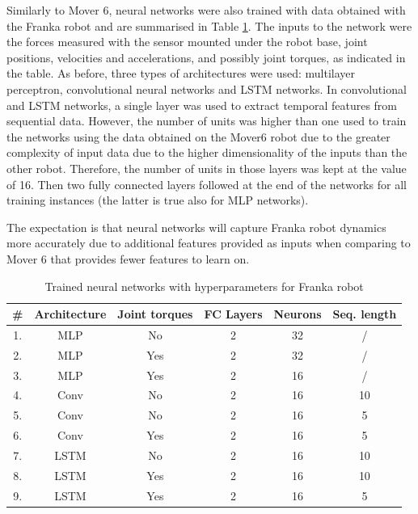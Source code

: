 Similarly to Mover 6, neural networks were also trained with data obtained with the Franka robot and are summarised in Table \ref{tab:NetworksFranka}. The inputs to the network were the forces measured with the sensor mounted under the robot base, joint positions, velocities and accelerations, and possibly joint torques, as indicated in the table. As before, three types of architectures were used: multilayer perceptron, convolutional neural networks and LSTM networks. In convolutional and LSTM networks, a single layer was used to extract temporal features from sequential data. However, the number of units was higher than one used to train the networks using the data obtained on the Mover6 robot due to the greater complexity of input data due to the higher dimensionality of the inputs than the other robot. Therefore, the number of units in those layers was kept at the value of 16. Then two fully connected layers followed at the end of the networks for all training instances (the latter is true also for MLP networks).

The expectation is that neural networks will capture Franka robot dynamics more accurately due to additional features provided as inputs when comparing to Mover 6 that provides fewer features to learn on.

\begin{table}
    \centering
    \caption{Trained neural networks with hyperparameters for Franka robot}
    \label{tab:NetworksFranka}
    \begin{tabular}{|c|c|c|c|c|c|}
        \hline
        \textbf{\#} & \textbf{Architecture} & \textbf{Joint torques} & \textbf{FC Layers} & \textbf{Neurons} & \textbf{Seq. length}  \\
        \hline
        \hline
        1. & MLP & No & 2 & 32 & / \\ %
        \hline
        2. & MLP & Yes & 2 & 32 & / \\ %
        \hline
        3. & MLP & Yes & 2 & 16 & / \\ %
        \hline
        4. & Conv & No & 2 & 16 & 10 \\ %
        \hline
        5. & Conv & No & 2 & 16 & 5\\ %
        \hline
        6. & Conv & Yes & 2 & 16 & 5 \\ %
        \hline
        7. & LSTM & No & 2 & 16 & 10 \\ %
        \hline
        8. & LSTM & Yes & 2 & 16 & 10 \\ %
        \hline
        9. & LSTM & Yes & 2 & 16 & 5\\ %
        \hline
    \end{tabular}
\end{table}

